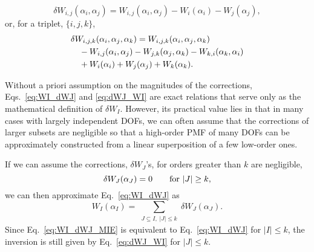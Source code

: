 \documentclass[reprint, superscriptaddress]{revtex4-1}
\begin{document}
%
\begin{equation}
  \delta W_{i,j}(\alpha_i, \alpha_j)
  =
  W_{i,j}(\alpha_i, \alpha_j)
  - W_{i}(\alpha_i) - W_{j}(\alpha_j)
  ,
  \label{eq:dWij}
\end{equation}
%
or, for a triplet, $\{i, j, k\}$,
%
\begin{align}
  &\delta W_{i,j,k}(\alpha_i, \alpha_j, \alpha_k)
  =
  W_{i,j,k}(\alpha_i, \alpha_j, \alpha_k)
  \notag\\
  &\quad
  - W_{i,j}(\alpha_i, \alpha_j)
  - W_{j,k}(\alpha_j, \alpha_k)
  - W_{k,i}(\alpha_k, \alpha_i)
  \notag\\
  &\quad
  + W_i(\alpha_i)
  + W_j(\alpha_j)
  + W_k(\alpha_k)
  .
  \label{eq:dWijk}
\end{align}




Without a priori assumption on the magnitudes of the corrections,
Eqs.~\eqref{eq:WI_dWJ} and \eqref{eq:dWJ_WI} are exact relations
that serve only as the mathematical definition of $\delta W_I$.
%
However, its practical value lies in that in many cases
with largely independent DOFs,
we can often assume
that the corrections of larger subsets are negligible
so that a high-order PMF of many DOFs can be approximately constructed
from a linear superposition of a few low-order ones.


If we can assume the corrections, $\delta W_J$'s,
for orders greater than $k$ are negligible,
%
\begin{equation}
  \delta W_J(\alpha_J) = 0
  \qquad
  \mbox{for $|J| \ge k$}
  ,
  \notag
\end{equation}
%
we can then approximate Eq.~\eqref{eq:WI_dWJ} as
%
\begin{equation}
  W_I(\alpha_I)
  =
  \sum_{ \substack{J \subseteq I, \; |J| \le k} }
  \!\! \delta W_J(\alpha_J)
  .
  \label{eq:WI_dWJ_MIE}
\end{equation}
%
Since Eq.~\eqref{eq:WI_dWJ_MIE}
is equivalent to Eq.~\eqref{eq:WI_dWJ}
for $|I| \le k$,
the inversion is still given by Eq.~\eqref{eq:dWJ_WI} for $|J| \le k$.
\end{document}
